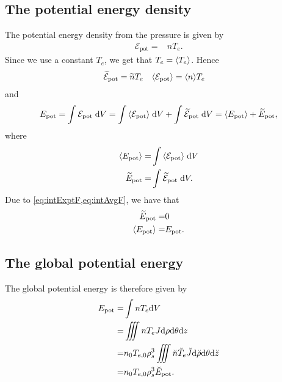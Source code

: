 \subsection{The potential energy density}
The potential energy density from the pressure is given by%
%
\begin{align*}
    \mathcal{E}_{\text{pot}} =& nT_e.
\end{align*}
%
Since we use a constant $T_e$, we get that $T_e=\langle{T_e}\rangle$.
Hence
%
\begin{align*}
    &\widetilde{ \mathcal{E}}_{\text{pot}} = \widetilde{ n}T_e&
    &\langle{\mathcal{E}_{\text{pot}}}\rangle = \langle{n}\rangle T_e&
\end{align*}
%
and
%
\begin{align*}
    E_{\text{pot}}
    = \int {\mathcal{E}_{\text{pot}}} \; \text{d} {V}
    = \int {\langle{\mathcal{E}_{\text{pot}}}\rangle} \; \text{d} {V} + \int {\widetilde{ \mathcal{E}}_{\text{pot}}} \; \text{d} {V}
    = \langle{E_{\text{pot}}}\rangle + \widetilde{ E}_{\text{pot}},
\end{align*}
%
where
%
\begin{align*}
    \langle{E_{\text{pot}}}\rangle =& \int {\langle{\mathcal{E}_{\text{pot}}}\rangle} \; \text{d} {V}\\
    \widetilde{ E}_{\text{pot}} =& \int {\widetilde{ \mathcal{E}}_{\text{pot}}} \; \text{d} {V}.
\end{align*}
%
Due to \cref{eq:intExptF,eq:intAvgF}, we have that
%
\begin{align*}
    \widetilde{ E}_{\text{pot}} =& 0\\
    \langle{E_{\text{pot}}}\rangle =& E_{\text{pot}}.
\end{align*}

\subsection{The global potential energy}
%
The global potential energy is therefore given by
%
\begin{align*}
    E_{\text{pot}}
    =& \int nT_e \text{d} V
    \\
    =& \iiint nT_e J \text{d}\rho \text{d}\theta \text{d} z
    \\
    =& n_0T_{e,0}\rho_s^3\iiint \breve{n}\breve{T}_e \breve{J} \text{d}\breve{\rho} \text{d}\theta \text{d} \breve{z}
    \\
    =& n_0T_{e,0}\rho_s^3\breve{E}_{\text{pot}}.
\end{align*}
